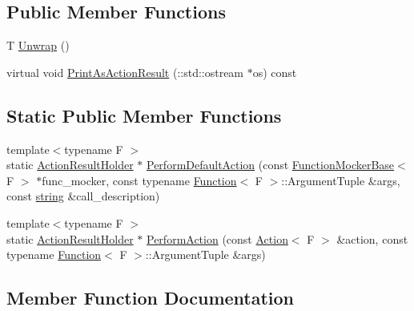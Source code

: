 \subsection*{Public Member Functions}
\begin{DoxyCompactItemize}
\item 
T \hyperlink{classtesting_1_1internal_1_1ActionResultHolder_a057df6cceeeab9ea06e679bcf6b78960}{Unwrap} ()
\item 
virtual void \hyperlink{classtesting_1_1internal_1_1ActionResultHolder_a70989192d3ed669c059a7e29c4a7b9fc}{Print\+As\+Action\+Result} (\+::std\+::ostream $\ast$os) const 
\end{DoxyCompactItemize}
\subsection*{Static Public Member Functions}
\begin{DoxyCompactItemize}
\item 
{\footnotesize template$<$typename F $>$ }\\static \hyperlink{classtesting_1_1internal_1_1ActionResultHolder}{Action\+Result\+Holder} $\ast$ \hyperlink{classtesting_1_1internal_1_1ActionResultHolder_a9609dcb5fb16271f83d777b087075272}{Perform\+Default\+Action} (const \hyperlink{classtesting_1_1internal_1_1FunctionMockerBase}{Function\+Mocker\+Base}$<$ F $>$ $\ast$func\+\_\+mocker, const typename \hyperlink{structtesting_1_1internal_1_1Function}{Function}$<$ F $>$\+::Argument\+Tuple \&args, const \hyperlink{namespacetesting_1_1internal_a8e8ff5b11e64078831112677156cb111}{string} \&call\+\_\+description)
\item 
{\footnotesize template$<$typename F $>$ }\\static \hyperlink{classtesting_1_1internal_1_1ActionResultHolder}{Action\+Result\+Holder} $\ast$ \hyperlink{classtesting_1_1internal_1_1ActionResultHolder_a9e10aff754b5caf69b14964f3c9c79ec}{Perform\+Action} (const \hyperlink{classtesting_1_1Action}{Action}$<$ F $>$ \&action, const typename \hyperlink{structtesting_1_1internal_1_1Function}{Function}$<$ F $>$\+::Argument\+Tuple \&args)
\end{DoxyCompactItemize}


\subsection{Member Function Documentation}
